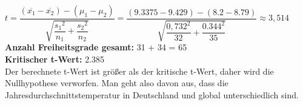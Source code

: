 \documentclass[12pt]{scrartcl}
\begin{document}
\begin{itemize}
$t=\dfrac{(\overline{x_{1}}-\overline{x_{2}}) - (\mu_{1}-\mu_{2})}{\sqrt{\dfrac{{s_{1}}^{2}}{n_1}+\dfrac{{s_{2}}^{2}}{n_2}}} 
=\dfrac{(9.3375 - 9.429)- (8.2-8.79)}{\sqrt{\dfrac{{0,732}^{2}}{32}+\dfrac{{0.344}^{2}}{35}}}  \approx 3,514$\\

\textbf{Anzahl Freiheitsgrade gesamt:} 31 + 34 = 65 \\
\textbf{Kritischer t-Wert:} 2.385\\
Der berechnete t-Wert ist größer als der kritische t-Wert, daher wird die Nullhypothese verworfen. Man geht also davon aus, dass die Jahresdurchschnittstemperatur in Deutschland und global unterschiedlich sind.
\end{itemize}
                        
                        
\end{document}
